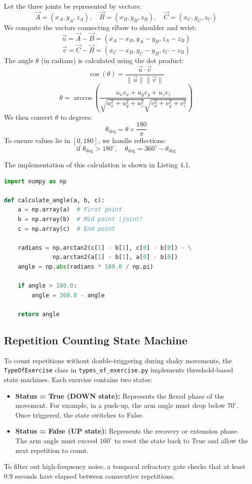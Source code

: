 Let the three joints be represented by vectors:
\[ \vec{A} = (x_A, y_A, z_A), \quad \vec{B} = (x_B, y_B, z_B), \quad \vec{C} = (x_C, y_C, z_C) \]
We compute the vectors connecting elbow to shoulder and wrist:
\[ \vec{u} = \vec{A} - \vec{B} = (x_A - x_B, y_A - y_B, z_A - z_B) \]
\[ \vec{v} = \vec{C} - \vec{B} = (x_C - x_B, y_C - y_B, z_C - z_B) \]
The angle $\theta$ (in radians) is calculated using the dot product:
\[ \cos(\theta) = \frac{\vec{u} \cdot \vec{v}}{\|\vec{u}\| \|\vec{v}\|} \]
\[ \theta = \arccos\left( \frac{u_x v_x + u_y v_y + u_z v_z}{\sqrt{u_x^2 + u_y^2 + u_z^2} \sqrt{v_x^2 + v_y^2 + v_z^2}} \right) \]
We then convert $\theta$ to degrees:
\[ \theta_{\text{deg}} = \theta \times \frac{180}{\pi} \]
To ensure values lie in $[0, 180]$, we handle reflections:
\[ \text{if } \theta_{\text{deg}} > 180^{\circ}, \quad \theta_{\text{deg}} = 360^{\circ} - \theta_{\text{deg}} \]

The implementation of this calculation is shown in Listing 4.1.

\begin{lstlisting}[language=Python, caption=Mathematical Angle Calculation from Joint Vectors, label=lst:angle_calc]
import numpy as np

def calculate_angle(a, b, c):
    a = np.array(a)  # First point
    b = np.array(b)  # Mid point (joint)
    c = np.array(c)  # End point

    radians = np.arctan2(c[1] - b[1], c[0] - b[0]) - \
              np.arctan2(a[1] - b[1], a[0] - b[0])
    angle = np.abs(radians * 180.0 / np.pi)

    if angle > 180.0:
        angle = 360.0 - angle

    return angle
\end{lstlisting}

\subsection{Repetition Counting State Machine}
To count repetitions without double-triggering during shaky movements, the \texttt{TypeOfExercise} class in \texttt{types\_of\_exercise.py} implements threshold-based state machines. Each exercise contains two states:
\begin{itemize}
    \item \textbf{Status = True (DOWN state):} Represents the flexed phase of the movement. For example, in a push-up, the arm angle must drop below $70^{\circ}$. Once triggered, the state switches to False.
    \item \textbf{Status = False (UP state):} Represents the recovery or extension phase. The arm angle must exceed $160^{\circ}$ to reset the state back to True and allow the next repetition to count.
\end{itemize}
To filter out high-frequency noise, a temporal refractory gate checks that at least $0.9$ seconds have elapsed between consecutive repetitions. 

